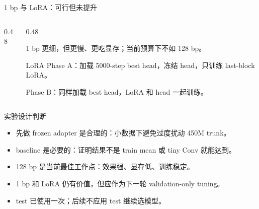 \documentclass[UTF8,aspectratio=169,10pt]{ctexbeamer}
\begin{document}
\begin{frame}{1 bp 与 LoRA：可行但未提升}
  \begin{columns}[T,onlytextwidth]
    \begin{column}{0.48\textwidth}
      \centering
    \end{column}
    \begin{column}{0.48\textwidth}
      \begin{block}{1 bp}
        更细，但更慢、更吃显存；当前预算下不如 128 bp。
      \end{block}
      \begin{block}{LoRA}
        Phase A：加载 5000-step best head，冻结 head，只训练 last-block LoRA。

        Phase B：同样加载 best head，LoRA 和 head 一起训练。
      \end{block}
    \end{column}
  \end{columns}
\end{frame}

\begin{frame}{实验设计判断}
  \begin{itemize}
    \item 先做 frozen adapter 是合理的：小数据下避免过度扰动 450M trunk。
    \item baseline 是必要的：证明结果不是 train mean 或 tiny Conv 就能达到。
    \item 128 bp 是当前最佳工作点：效果强、显存低、训练稳定。
    \item 1 bp 和 LoRA 仍有价值，但应作为下一轮 validation-only tuning。
    \item test 已使用一次；后续不应用 test 继续选模型。
  \end{itemize}
\end{frame}
\end{document}
